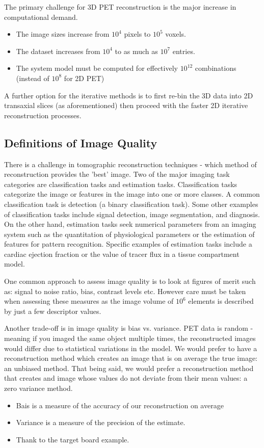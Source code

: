\documentclass{article}
\begin{document}
The primary challenge for 3D PET reconstruction is the major increase in computational demand. 
\begin{itemize}
\item The image sizes increase from $10^4$ pixels to $10^5$ voxels.
\item The dataset increases from $10^4$ to as much as $10^7$ entries. 
\item The system model must be computed for effectively $10^{12}$ combinations (instead of $10^8$ for 2D PET)
\end{itemize}
A further option for the iterative methods is to first re-bin the 3D data into 2D transaxial slices (as aforementioned) then proceed with the faster 2D iterative reconstruction processes.

\subsection{Definitions of Image Quality}
There is a challenge in tomographic reconstruction techniques - which method of reconstruction provides the 'best' image. Two of the major imaging task categories are classification tasks and estimation tasks. Classification tasks categorize the image or features in the image into one or more classes. A common classification task is detection (a binary classification task). Some other examples of classification tasks include signal detection, image segmentation, and diagnosis. On the other hand, estimation tasks seek numerical parameters from an imaging system such as the quantitation of physiological parameters or the estimation of features for pattern recognition. Specific examples of estimation tasks include a cardiac ejection fraction or the value of tracer flux in a tissue compartment model.

One common approach to assess image quality is to look at figures of merit  such as: signal to noise ratio, bias, contrast levels etc. However care must be taken when assessing these measures as the image volume of $10^6$ elements is described by just a few descriptor values. 

Another trade-off is in image quality is bias vs. variance. PET data is random - meaning if you imaged the same object multiple times, the reconstructed images would differ due to statistical variations in the model. We would prefer to have a reconstruction method which creates an image that is on average the true image: an unbiased method. That being said, we would prefer a reconstruction method that creates and image whose values do not deviate from their mean values: a zero variance method.
\begin{itemize}
\item Bais is a measure of the accuracy of our reconstruction on average
\item Variance is a measure of the precision of the estimate.
\item Thank to the target board example.
\end{itemize}
\end{document}
